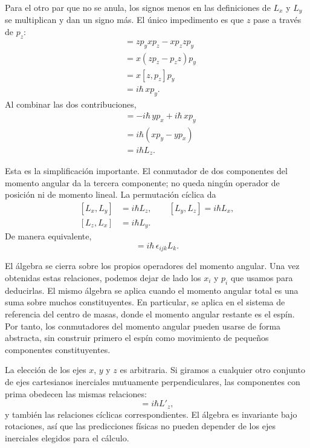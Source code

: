 Para el otro par que no se anula, los signos menos en las definiciones de \(L_x\) y \(L_y\) se multiplican y dan un signo más. El único impedimento es que \(z\) pase a través de \(p_z\):
\begin{align}
[zp_y,xp_z]
&=zp_yxp_z-xp_zzp_y \\
&=x(zp_z-p_zz)p_y \\
&=x[z,p_z]p_y \\
&=i\hbar\,xp_y.
\end{align}
Al combinar las dos contribuciones,
\begin{align}
[L_x,L_y]
&=-i\hbar\,yp_x+i\hbar\,xp_y \\
&=i\hbar(xp_y-yp_x) \\
&=i\hbar L_z.
\end{align}

Esta es la simplificación importante. El conmutador de dos componentes del momento angular da la tercera componente; no queda ningún operador de posición ni de momento lineal. La permutación cíclica da
\begin{equation}
\begin{aligned}
[L_x,L_y]&=i\hbar L_z,\qquad
[L_y,L_z]=i\hbar L_x,\\
[L_z,L_x]&=i\hbar L_y.
\end{aligned}
\end{equation}
De manera equivalente,
\begin{equation}
[L_i,L_j]=i\hbar\,\epsilon_{ijk}L_k.
\end{equation}

El álgebra se cierra sobre los propios operadores del momento angular. Una vez obtenidas estas relaciones, podemos dejar de lado los \(x_i\) y \(p_i\) que usamos para deducirlas. El mismo álgebra se aplica cuando el momento angular total es una suma sobre muchos constituyentes. En particular, se aplica en el sistema de referencia del centro de masas, donde el momento angular restante es el espín. Por tanto, los conmutadores del momento angular pueden usarse de forma abstracta, sin construir primero el espín como movimiento de pequeños componentes constituyentes.

La elección de los ejes \(x\), \(y\) y \(z\) es arbitraria. Si giramos a cualquier otro conjunto de ejes cartesianos inerciales mutuamente perpendiculares, las componentes con prima obedecen las mismas relaciones:
\begin{equation}
[L'_x,L'_y]=i\hbar L'_z,
\end{equation}
y también las relaciones cíclicas correspondientes. El álgebra es invariante bajo rotaciones, así que las predicciones físicas no pueden depender de los ejes inerciales elegidos para el cálculo.

